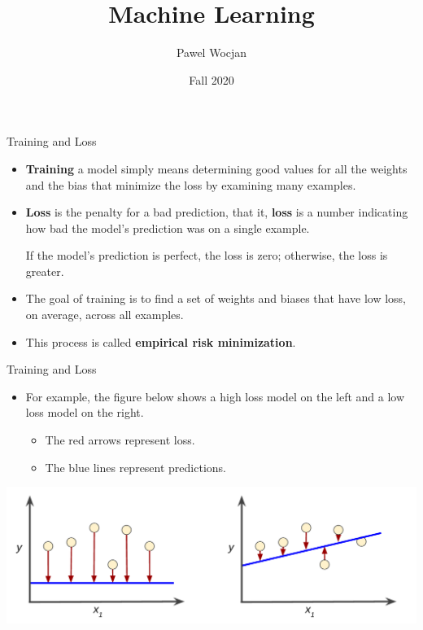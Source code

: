 \documentclass{beamer}
\title[ML]{Machine Learning}
\author{Pawel Wocjan}
\institute{University of Central Florida}
\date{Fall 2020}
\begin{document}
\begin{frame}
  \titlepage
\end{frame}


\begin{frame}{Training and Loss}
\begin{itemize}
\item {\bf Training} a model simply means determining good values for all the weights and the bias that minimize the loss by examining many examples.

\medskip    
\item {\bf Loss} is the penalty for a bad prediction, that it, {\bf loss} is a number indicating how bad the model's prediction was on a single example. 

\medskip
If the model's prediction is perfect, the loss is zero; otherwise, the loss is greater. 

\medskip   
\item The goal of training is to find a set of weights and biases that have low loss, on average, across all examples.

\medskip
\item This process is called {\bf empirical risk minimization}.
\end{itemize}
\end{frame}


\begin{frame}{Training and Loss}
\begin{itemize}
\item For example, the figure below shows a high loss model on the left and a low loss model on the right. 

\medskip
\begin{itemize}
\item The red arrows represent loss.

\medskip
\item The blue lines represent predictions.
\end{itemize}
\end{itemize}
\includegraphics[width=\textwidth]{images/LossSideBySide.png}
\end{frame}
\end{document}
